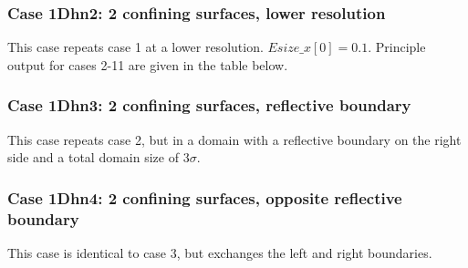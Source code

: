 \documentclass[10pt,onecolumn]{article}
\begin{document}

%



%





%



\subsubsection{Case 1Dhn2:  2 confining surfaces, lower resolution}  This case repeats
case 1 at a lower resolution.  $Esize\_x[0]=0.1$.  Principle output for cases 2-11 are given in 
the table below.

\subsubsection{Case 1Dhn3:  2 confining surfaces, reflective boundary}  This case repeats
case 2, but in a domain with a reflective boundary on the right side and
a total domain size of $3\sigma$. 

\subsubsection{Case 1Dhn4:  2 confining surfaces, opposite reflective boundary}
This case is identical to case 3, but exchanges the left and right boundaries.
\end{document}
